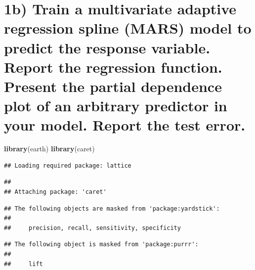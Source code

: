 \documentclass[
]{article}
\newenvironment{Shaded}{\begin{snugshade}}{\end{snugshade}}
\newcommand{\FunctionTok}[1]{\textcolor[rgb]{0.13,0.29,0.53}{\textbf{#1}}}
\newcommand{\NormalTok}[1]{#1}
\begin{document}
\newpage

\hypertarget{b-train-a-multivariate-adaptive-regression-spline-mars-model-to-predict-the-response-variable.-report-the-regression-function.-present-the-partial-dependence-plot-of-an-arbitrary-predictor-in-your-model.-report-the-test-error.}{%
\section{1b) Train a multivariate adaptive regression spline (MARS)
model to predict the response variable. Report the regression function.
Present the partial dependence plot of an arbitrary predictor in your
model. Report the test
error.}\label{b-train-a-multivariate-adaptive-regression-spline-mars-model-to-predict-the-response-variable.-report-the-regression-function.-present-the-partial-dependence-plot-of-an-arbitrary-predictor-in-your-model.-report-the-test-error.}}

\begin{Shaded}
\begin{Highlighting}[]
\FunctionTok{library}\NormalTok{(earth)}
\FunctionTok{library}\NormalTok{(caret)}
\end{Highlighting}
\end{Shaded}

\begin{verbatim}
## Loading required package: lattice
\end{verbatim}

\begin{verbatim}
## 
## Attaching package: 'caret'
\end{verbatim}

\begin{verbatim}
## The following objects are masked from 'package:yardstick':
## 
##     precision, recall, sensitivity, specificity
\end{verbatim}

\begin{verbatim}
## The following object is masked from 'package:purrr':
## 
##     lift
\end{verbatim}
\end{document}
